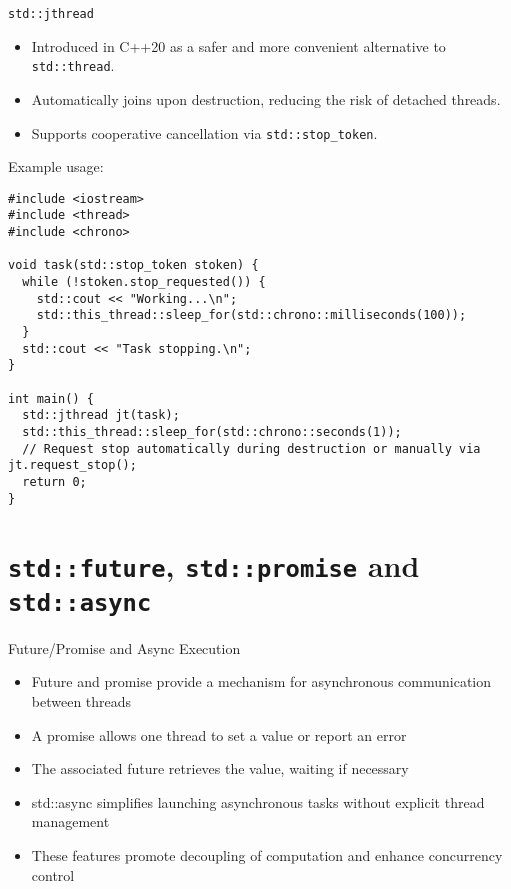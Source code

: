 \documentclass{beamer}
\begin{document}
\begin{frame}[fragile]{\texttt{std::jthread}}
  \begin{itemize}
    \item Introduced in C++20 as a safer and more convenient alternative to \texttt{std::thread}.
    \item Automatically joins upon destruction, reducing the risk of detached threads.
    \item Supports cooperative cancellation via \texttt{std::stop\_token}.
  \end{itemize}
  Example usage:
  \lstset{style=CStyle}
  \begin{lstlisting}
#include <iostream>
#include <thread>
#include <chrono>

void task(std::stop_token stoken) {
  while (!stoken.stop_requested()) {
    std::cout << "Working...\n";
    std::this_thread::sleep_for(std::chrono::milliseconds(100));
  }
  std::cout << "Task stopping.\n";
}

int main() {
  std::jthread jt(task);
  std::this_thread::sleep_for(std::chrono::seconds(1));
  // Request stop automatically during destruction or manually via jt.request_stop();
  return 0;
}
  \end{lstlisting}
\end{frame}

\section{\texttt{std::future}, \texttt{std::promise} and \texttt{std::async}}

\begin{frame}{Future/Promise and Async Execution}
  \begin{itemize}
    \item Future and promise provide a mechanism for asynchronous communication between threads
    \item A promise allows one thread to set a value or report an error
    \item The associated future retrieves the value, waiting if necessary
    \item std::async simplifies launching asynchronous tasks without explicit thread management
    \item These features promote decoupling of computation and enhance concurrency control
  \end{itemize}
\end{frame}
\end{document}
